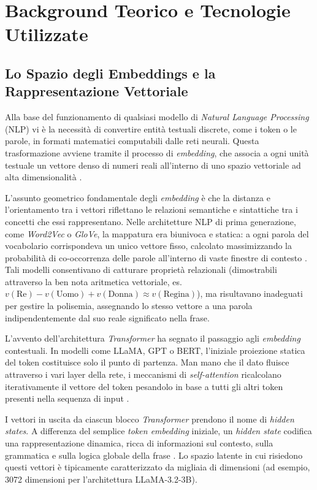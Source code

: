 \section{Background Teorico e Tecnologie Utilizzate}
\label{sec:background}

\subsection{Lo Spazio degli Embeddings e la Rappresentazione Vettoriale}
\label{sec:spazio_embeddings}

Alla base del funzionamento di qualsiasi modello di \textit{Natural Language Processing} (NLP) vi è la necessità di convertire entità testuali discrete, come i token o le parole, in formati matematici computabili dalle reti neurali. Questa trasformazione avviene tramite il processo di \textit{embedding}, che associa a ogni unità testuale un vettore denso di numeri reali all'interno di uno spazio vettoriale ad alta dimensionalità \cite{mikolov2013efficient}.

L'assunto geometrico fondamentale degli \textit{embedding} è che la distanza e l'orientamento tra i vettori riflettano le relazioni semantiche e sintattiche tra i concetti che essi rappresentano. Nelle architetture NLP di prima generazione, come \textit{Word2Vec} o \textit{GloVe}, la mappatura era biunivoca e statica: a ogni parola del vocabolario corrispondeva un unico vettore fisso, calcolato massimizzando la probabilità di co-occorrenza delle parole all'interno di vaste finestre di contesto \cite{mikolov2013efficient}. Tali modelli consentivano di catturare proprietà relazionali (dimostrabili attraverso la ben nota aritmetica vettoriale, es. $v(\text{Re}) - v(\text{Uomo}) + v(\text{Donna}) \approx v(\text{Regina})$), ma risultavano inadeguati per gestire la polisemia, assegnando lo stesso vettore a una parola indipendentemente dal suo reale significato nella frase.

L'avvento dell'architettura \textit{Transformer} \cite{vaswani2017attention} ha segnato il passaggio agli \textit{embedding} contestuali. In modelli come LLaMA, GPT o BERT, l'iniziale proiezione statica del token costituisce solo il punto di partenza. Man mano che il dato fluisce attraverso i vari layer della rete, i meccanismi di \textit{self-attention} ricalcolano iterativamente il vettore del token pesandolo in base a tutti gli altri token presenti nella sequenza di input \cite{vaswani2017attention}. 

I vettori in uscita da ciascun blocco \textit{Transformer} prendono il nome di \textit{hidden states}. A differenza del semplice \textit{token embedding} iniziale, un \textit{hidden state} codifica una rappresentazione dinamica, ricca di informazioni sul contesto, sulla grammatica e sulla logica globale della frase \cite{belrose2023eliciting}. Lo spazio latente in cui risiedono questi vettori è tipicamente caratterizzato da migliaia di dimensioni (ad esempio, 3072 dimensioni per l'architettura LLaMA-3.2-3B).

